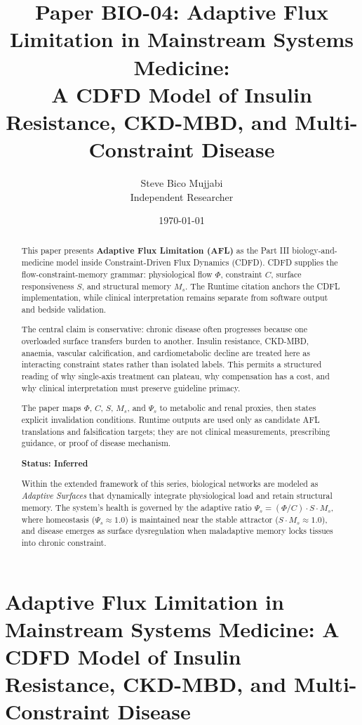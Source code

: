 \documentclass[12pt,a4paper]{article}
\title{\textbf{Paper BIO-04: Adaptive Flux Limitation in Mainstream Systems Medicine:\\ A CDFD Model of Insulin Resistance, CKD-MBD, and Multi-Constraint Disease}}
\author{Steve Bico Mujjabi\\ \small Independent Researcher}
\date{\today}
\begin{document}
\maketitle

\clearpage
\section*{Adaptive Flux Limitation in Mainstream Systems Medicine: A CDFD Model of Insulin Resistance, CKD-MBD, and Multi-Constraint Disease}

\begin{abstract}

This paper presents \textbf{Adaptive Flux Limitation (AFL)} as the Part III biology-and-medicine model inside Constraint-Driven Flux Dynamics (CDFD). CDFD supplies the flow-constraint-memory grammar: physiological flow $\Phi$, constraint $C$, surface responsiveness $S$, and structural memory $M_s$. The Runtime citation anchors the CDFL implementation, while clinical interpretation remains separate from software output and bedside validation.

The central claim is conservative: chronic disease often progresses because one overloaded surface transfers burden to another. Insulin resistance, CKD-MBD, anaemia, vascular calcification, and cardiometabolic decline are treated here as interacting constraint states rather than isolated labels. This permits a structured reading of why single-axis treatment can plateau, why compensation has a cost, and why clinical interpretation must preserve guideline primacy.

The paper maps $\Phi$, $C$, $S$, $M_s$, and $\Psi_s$ to metabolic and renal proxies, then states explicit invalidation conditions. Runtime outputs are used only as candidate AFL translations and falsification targets; they are not clinical measurements, prescribing guidance, or proof of disease mechanism.

\textbf{Status: Inferred}

\medskip
\noindent Within the extended framework of this series, biological networks are modeled as \emph{Adaptive Surfaces} that dynamically integrate physiological load and retain structural memory. The system's health is governed by the adaptive ratio $\Psi_s = (\Phi/C) \cdot S \cdot M_s$, where homeostasis ($\Psi_s \approx 1.0$) is maintained near the stable attractor ($S \cdot M_s \approx 1.0$), and disease emerges as surface dysregulation when maladaptive memory locks tissues into chronic constraint.

\end{abstract}
\end{document}
